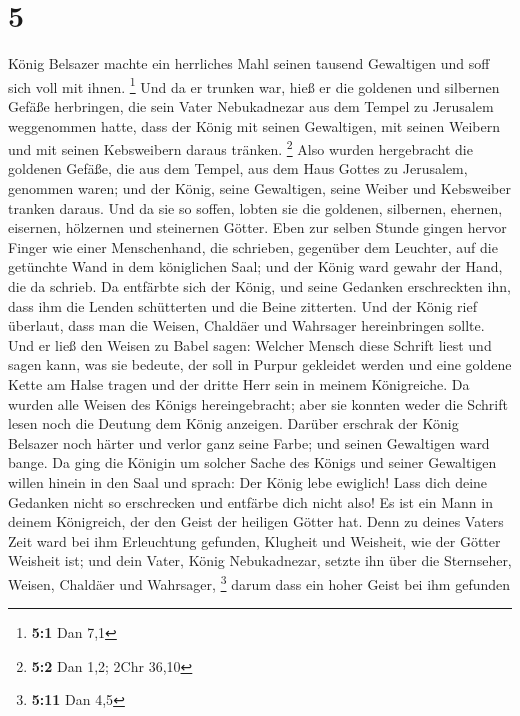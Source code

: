 \hypertarget{section-3}{%
\section{5}\label{section-3}}

 König Belsazer machte ein herrliches Mahl seinen tausend
Gewaltigen und soff sich voll mit ihnen. \footnote{\textbf{5:1} Dan 7,1}
 Und da er trunken war, hieß er die goldenen und silbernen
Gefäße herbringen, die sein Vater Nebukadnezar aus dem Tempel zu
Jerusalem weggenommen hatte, dass der König mit seinen Gewaltigen, mit
seinen Weibern und mit seinen Kebsweibern daraus tränken. \footnote{\textbf{5:2}
  Dan 1,2; 2Chr 36,10}  Also wurden hergebracht die goldenen
Gefäße, die aus dem Tempel, aus dem Haus Gottes zu Jerusalem, genommen
waren; und der König, seine Gewaltigen, seine Weiber und Kebsweiber
tranken daraus.  Und da sie so soffen, lobten sie die
goldenen, silbernen, ehernen, eisernen, hölzernen und steinernen Götter.
 Eben zur selben Stunde gingen hervor Finger wie einer
Menschenhand, die schrieben, gegenüber dem Leuchter, auf die getünchte
Wand in dem königlichen Saal; und der König ward gewahr der Hand, die da
schrieb.  Da entfärbte sich der König, und seine Gedanken
erschreckten ihn, dass ihm die Lenden schütterten und die Beine
zitterten.  Und der König rief überlaut, dass man die
Weisen, Chaldäer und Wahrsager hereinbringen sollte. Und er ließ den
Weisen zu Babel sagen: Welcher Mensch diese Schrift liest und sagen
kann, was sie bedeute, der soll in Purpur gekleidet werden und eine
goldene Kette am Halse tragen und der dritte Herr sein in meinem
Königreiche.  Da wurden alle Weisen des Königs
hereingebracht; aber sie konnten weder die Schrift lesen noch die
Deutung dem König anzeigen.  Darüber erschrak der König
Belsazer noch härter und verlor ganz seine Farbe; und seinen Gewaltigen
ward bange.  Da ging die Königin um solcher Sache des
Königs und seiner Gewaltigen willen hinein in den Saal und sprach: Der
König lebe ewiglich! Lass dich deine Gedanken nicht so erschrecken und
entfärbe dich nicht also!  Es ist ein Mann in deinem
Königreich, der den Geist der heiligen Götter hat. Denn zu deines Vaters
Zeit ward bei ihm Erleuchtung gefunden, Klugheit und Weisheit, wie der
Götter Weisheit ist; und dein Vater, König Nebukadnezar, setzte ihn über
die Sternseher, Weisen, Chaldäer und Wahrsager, \footnote{\textbf{5:11}
  Dan 4,5}  darum dass ein hoher Geist bei ihm gefunden
